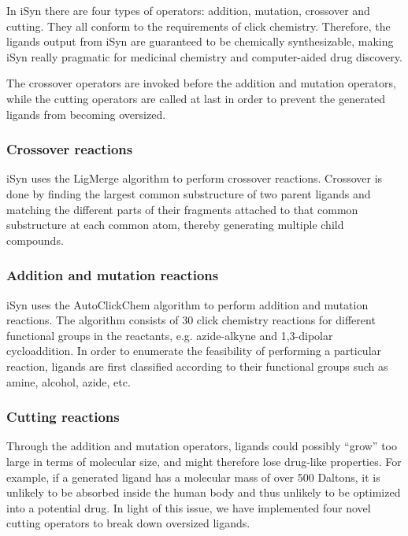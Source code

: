 In iSyn there are four types of operators: addition, mutation, crossover and cutting. They all conform to the requirements of click chemistry. Therefore, the ligands output from iSyn are guaranteed to be chemically synthesizable, making iSyn really pragmatic for medicinal chemistry and computer-aided drug discovery.

The crossover operators are invoked before the addition and mutation operators, while the cutting operators are called at last in order to prevent the generated ligands from becoming oversized.

\subsubsection{Crossover reactions}

iSyn uses the LigMerge algorithm \citep{1181} to perform crossover reactions. Crossover is done by finding the largest common substructure of two parent ligands and matching the different parts of their fragments attached to that common substructure at each common atom, thereby generating multiple child compounds.

\subsubsection{Addition and mutation reactions}

iSyn uses the AutoClickChem algorithm \citep{1051} to perform addition and mutation reactions. The algorithm consists of 30 click chemistry reactions for different functional groups in the reactants, e.g. azide-alkyne and 1,3-dipolar cycloaddition. In order to enumerate the feasibility of performing a particular reaction, ligands are first classified according to their functional groups such as amine, alcohol, azide, etc.

\subsubsection{Cutting reactions}

Through the addition and mutation operators, ligands could possibly ``grow” too large in terms of molecular size, and might therefore lose drug-like properties. For example, if a generated ligand has a molecular mass of over 500 Daltons, it is unlikely to be absorbed inside the human body and thus unlikely to be optimized into a potential drug. In light of this issue, we have implemented four novel cutting operators to break down oversized ligands.

